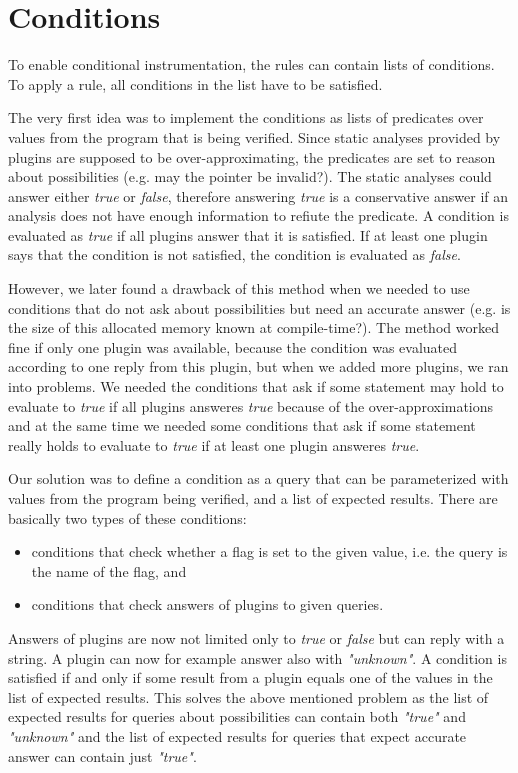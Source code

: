 \section{Conditions}\label{sec:conditions}

To enable conditional instrumentation, the rules can contain lists of
conditions. To apply a rule, all conditions in the list have to be satisfied.

The very first idea was to implement the conditions as lists of predicates over
values from the program that is being verified. Since static analyses provided
by plugins are supposed to be over-approximating, the predicates are set to
reason about possibilities (e.g. may the pointer be invalid?). The static
analyses could answer either \emph{true} or \emph{false}, therefore answering
\emph{true} is a conservative answer if an analysis does not have enough
information to refiute the predicate. A condition is evaluated as \emph{true}
if all plugins answer that it is satisfied. If at least one plugin says that
the condition is not satisfied, the condition is evaluated as \emph{false}.

However, we later found a drawback of this method when we needed to use
conditions that do not ask about possibilities but need an accurate answer
(e.g. is the size of this allocated memory known at compile-time?). The method
worked fine if only one plugin was available, because the condition was
evaluated according to one reply from this plugin, but when we added more
plugins, we ran into problems. We needed the conditions that ask if some
statement may hold to evaluate to \emph{true} if all plugins answeres
\emph{true} because of the over-approximations and at the same time we needed
some conditions that ask if some statement really holds to evaluate to
\emph{true} if at least one plugin answeres \emph{true}.

Our solution was to define a condition as a query that can be parameterized
with values from the program being verified, and a list of expected results.
There are basically two types of these conditions:
\begin{itemize}
 \item conditions that check whether a flag is set to the given value, i.e. the
 query is the name of the flag, and
 \item conditions that check answers of plugins to given queries.
\end{itemize}
Answers of plugins are now not limited only to \emph{true} or \emph{false} but
can reply with a string. A plugin can now for example answer also with
\emph{"unknown"}. A condition is satisfied if and only if some result from a
plugin equals one of the values in the list of expected results. This solves
the above mentioned problem as the list of expected results for queries about
possibilities can contain both \emph{"true"} and \emph{"unknown"} and the list
of expected results for queries that expect accurate answer can contain just
\emph{"true"}.

